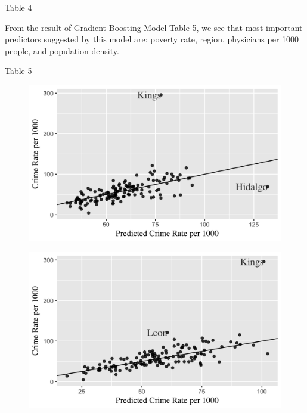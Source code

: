 \documentclass[preprint,12pt,3p]{elsarticle}
\begin{document}
\begin{center}
      \caption{Table 4}
\end{center}

From the result of Gradient Boosting Model Table 5, we see that most important predictors suggested by this model are: poverty rate, region, physicians per 1000 people, and population density.
\begin{center}
      \caption{Table 5}
\end{center}


\begin{figure}[!htb]\centering
   \begin{minipage}{0.49\textwidth}
     \includegraphics[width=\linewidth]{pics/2.png}
     \label{Fig:Data1}
   \end{minipage}
   \begin {minipage}{0.49\textwidth}
     \includegraphics[width=\linewidth]{pics/3.png}
     \label{Fig:Data2}
   \end{minipage}
\end{figure}
\end{document}
